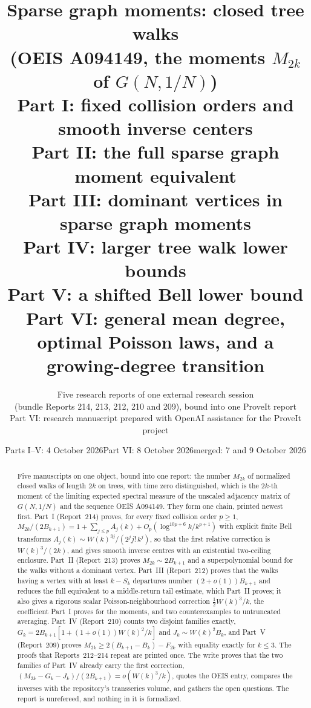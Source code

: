 \documentclass[11pt,letterpaper]{article}
\title{\textbf{Sparse graph moments: closed tree walks}\\[4pt]\large (OEIS A094149, the moments $M_{2k}$ of $G(N,1/N)$)\\[8pt]
\normalsize Part I: fixed collision orders and smooth inverse centers\\[2pt]
Part II: the full sparse graph moment equivalent\\[2pt]
Part III: dominant vertices in sparse graph moments\\[2pt]
Part IV: larger tree walk lower bounds\\[2pt]
Part V: a shifted Bell lower bound\\[2pt]
Part VI: general mean degree, optimal Poisson laws, and a growing-degree transition}
\author{Five research reports of one external research session\\(bundle Reports 214, 213, 212, 210 and 209), bound into one ProveIt report\\[2pt]Part VI: research manuscript prepared with OpenAI assistance for the ProveIt project}
\date{Parts I--V: 4 October 2026\quad Part VI: 8 October 2026\quad merged: 7 and 9 October 2026}
\theoremstyle{remark}\newtheorem{remark}[theorem]{Remark}
\theoremstyle{definition}\newtheorem{definition}[theorem]{Definition}
\begin{document}
\hypersetup{pageanchor=false}
\maketitle\thispagestyle{fancy}
\begin{abstract}
Five manuscripts on one object, bound into one report: the number $M_{2k}$ of normalized closed walks of length $2k$ on trees, with time zero distinguished, which is the $2k$-th moment of the limiting expected spectral measure of the unscaled adjacency matrix of $G(N,1/N)$ and the sequence OEIS A094149. They form one chain, printed newest first. Part~I (Report~214) proves, for every fixed collision order $p\ge1$, $M_{2k}/(2B_{k+1})=1+\sum_{j\le p}A_j(k)+O_p(\log^{10p+6}k/k^{p+1})$ with explicit finite Bell transforms $A_j(k)\sim W(k)^{3j}/(2^jj!\,k^j)$, so that the first relative correction is $W(k)^3/(2k)$, and gives smooth inverse centres with an existential two-ceiling enclosure. Part~II (Report~213) proves $M_{2k}\sim2B_{k+1}$ and a superpolynomial bound for the walks without a dominant vertex. Part~III (Report~212) proves that the walks having a vertex with at least $k-S_k$ departures number $(2+o(1))B_{k+1}$ and reduces the full equivalent to a middle-return tail estimate, which Part~II proves; it also gives a rigorous scalar Poisson-neighbourhood correction $\frac12W(k)^3/k$, the coefficient Part~I proves for the moments, and two counterexamples to untruncated averaging. Part~IV (Report~210) counts two disjoint families exactly, $G_k=2B_{k+1}[1+(1+o(1))W(k)^2/k]$ and $J_k\sim W(k)^2B_k$, and Part~V (Report~209) proves $M_{2k}\ge2(B_{k+1}-B_k)-F_{2k}$ with equality exactly for $k\le3$. The proofs that Reports~212--214 repeat are printed once. The write proves that the two families of Part~IV already carry the first correction, $(M_{2k}-G_k-J_k)/(2B_{k+1})=o(W(k)^3/k)$, quotes the OEIS entry, compares the inverses with the repository's transseries volume, and gathers the open questions. The report is unrefereed, and nothing in it is formalized.
\end{abstract}
\hypersetup{pageanchor=true}
{\small\setcounter{tocdepth}{1}\setlength{\parskip}{0pt}\tableofcontents}
\newpage
\end{document}

